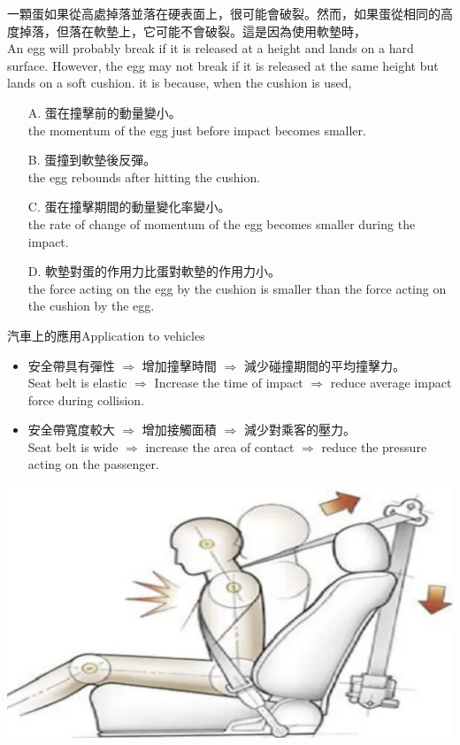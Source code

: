 \documentclass[13pt]{beamer}
\begin{document}
\begin{frame}{}
    一顆蛋如果從高處掉落並落在硬表面上，很可能會破裂。然而，如果蛋從相同的高度掉落，但落在軟墊上，它可能不會破裂。這是因為使用軟墊時，\\An egg will probably break if it is released at a height and lands on a hard surface. However, the egg may not break if it is released at the same height but lands on a soft cushion. it is because, when the cushion is used,
    \begin{itemize}
        \item[A.] 蛋在撞擊前的動量變小。\\the momentum of the egg just before impact becomes smaller.
        \item[B.] 蛋撞到軟墊後反彈。\\the egg rebounds after hitting the cushion.
        \item[C.] 蛋在撞擊期間的動量變化率變小。\\the rate of change of momentum of the egg becomes smaller during the impact.
        \item[D.] 軟墊對蛋的作用力比蛋對軟墊的作用力小。\\the force acting on the egg by the cushion is smaller than the force acting on the cushion by the egg.
    \end{itemize}
\end{frame}


\begin{frame}{汽車上的應用Application to vehicles}
    \begin{itemize}
        \item 安全帶具有彈性 $\Rightarrow$ 增加撞擊時間 $\Rightarrow$ 減少碰撞期間的平均撞擊力。\\Seat belt is elastic $\Rightarrow$ Increase the time of impact  $\Rightarrow$ reduce average impact force during collision.
        \item 安全帶寬度較大 $\Rightarrow$ 增加接觸面積 $\Rightarrow$ 減少對乘客的壓力。\\Seat belt is wide $\Rightarrow$ increase the area of contact $\Rightarrow$ reduce the pressure acting on the passenger.
    \end{itemize}
    {\par\centering
    \includegraphics[width=.4\textwidth]{assets/c2b28cb9.png}
    \par}
\end{frame}
\end{document}
